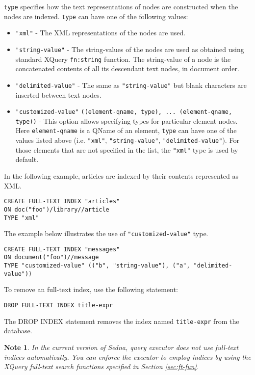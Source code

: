 \documentclass[a4paper,12pt]{article}
\newtheorem{note}{Note}
\begin{document}
\verb!type! specifies how the text representations of nodes are constructed when the nodes are indexed. \verb!type! can have one of the following values:
\begin{itemize}
\item \verb!"xml"! - The XML representations of the nodes are used.
\item \verb!"string-value"! - The string-values of the nodes are used as obtained using standard XQuery \verb!fn:string! function. The string-value of a node is the concatenated contents of all its descendant text nodes, in document order.
\item \verb!"delimited-value"! - The same as \verb!"string-value"! but blank characters are inserted between  text nodes.
\item \verb!"customized-value"! \verb!((element-qname, type), ... (element-qname, type))! - This option allows specifying  types for particular element nodes. Here \verb!element-qname! is a QName of an element, \verb!type! can have one of the values listed above (i.e. \verb!"xml"!, \verb!"string-value"!, \verb!"delimited-value"!). For those elements that are not specified in the list, the \verb!"xml"! type is used by default.
\end{itemize}

In the following example, articles are indexed by their contents represented as XML.

\begin{verbatim}
CREATE FULL-TEXT INDEX "articles"
ON doc("foo")/library//article
TYPE "xml"
\end{verbatim}

The example below illustrates the use of \verb!"customized-value"! type.
\begin{verbatim}
CREATE FULL-TEXT INDEX "messages"
ON document("foo")//message
TYPE "customized-value" (("b", "string-value"), ("a", "delimited-value"))
\end{verbatim}

To remove an full-text index, use the following statement:
\begin{verbatim}
DROP FULL-TEXT INDEX title-expr
\end{verbatim}

The DROP INDEX statement removes the index named \verb!title-expr! from the database.

\begin{note}In the current version of Sedna, query executor does not use full-text indices automatically. You can enforce the executor to employ indices by
using the XQuery full-text search functions specified in Section \ref{sec:ft-fun}.
\end{note}
\end{document}
